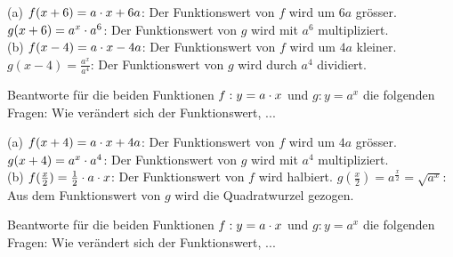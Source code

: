 \documentclass[11pt]{exam}
\begin{document}
\begin{questions}
{\begin{solution}
		(a) $f(x+6)=a\cdot x+6a$: Der Funktionswert von $f$ wird um $6a$ grösser. $g(x+6)=a^x\cdot a^6$: Der Funktionswert von $g$ wird mit $a^6$ multipliziert.\\
		(b) $f(x-4)=a\cdot x-4a$: Der Funktionswert von $f$ wird um $4a$ kleiner. $g(x-4)=\frac{a^x}{a^4}$: Der Funktionswert von $g$ wird durch $a^4$ dividiert.
\end{solution}}
{}


\noaddpoints
\question[\totalpoints]
\addpoints
Beantworte für die beiden Funktionen $f:y=a\cdot x$ und $g:y=a^x$ die folgenden Fragen: Wie verändert sich der Funktionswert, ...
{\begin{solution}
		(a) $f(x+4)=a\cdot x+4a$: Der Funktionswert von $f$ wird um $4a$ grösser. $g(x+4)=a^x\cdot a^4$: Der Funktionswert von $g$ wird mit $a^4$ multipliziert.\\
		(b) $f(\frac{x}{2})=\frac{1}{2}\cdot a\cdot x$: Der Funktionswert von $f$ wird halbiert. $g(\frac{x}{2})=a^{\frac{x}{2}}=\sqrt{a^x}$: Aus dem Funktionswert von $g$ wird die Quadratwurzel gezogen.
\end{solution}}
{}


\noaddpoints
\question[\totalpoints]
\addpoints
Beantworte für die beiden Funktionen $f:y=a\cdot x$ und $g:y=a^x$ die folgenden Fragen: Wie verändert sich der Funktionswert, ...
\begin{parts}

\end{parts}
\end{questions}
\end{document}
